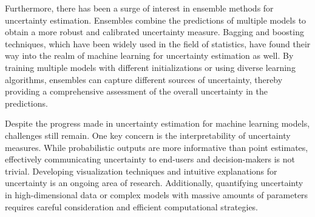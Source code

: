 Furthermore, there has been a surge of interest in ensemble methods for uncertainty estimation. Ensembles combine the predictions of multiple models to obtain a more robust and calibrated uncertainty measure. Bagging and boosting techniques, which have been widely used in the field of statistics, have found their way into the realm of machine learning for uncertainty estimation as well. By training multiple models with different initializations or using diverse learning algorithms, ensembles can capture different sources of uncertainty, thereby providing a comprehensive assessment of the overall uncertainty in the predictions.

Despite the progress made in uncertainty estimation for machine learning models, challenges still remain. One key concern is the interpretability of uncertainty measures. While probabilistic outputs are more informative than point estimates, effectively communicating uncertainty to end-users and decision-makers is not trivial. Developing visualization techniques and intuitive explanations for uncertainty is an ongoing area of research. Additionally, quantifying uncertainty in high-dimensional data or complex models with massive amounts of parameters requires careful consideration and efficient computational strategies.


